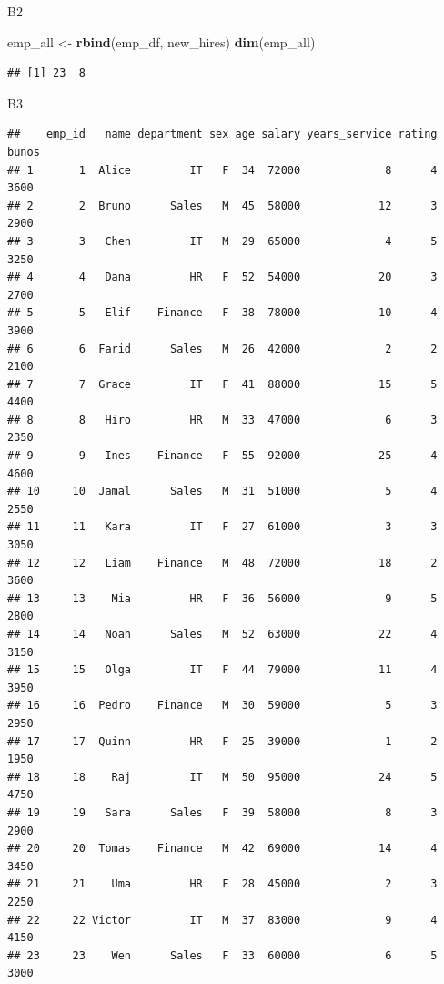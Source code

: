 \documentclass[
]{article}
\newenvironment{Shaded}{\begin{snugshade}}{\end{snugshade}}
\newcommand{\FloatTok}[1]{\textcolor[rgb]{0.00,0.00,0.81}{#1}}
\newcommand{\FunctionTok}[1]{\textcolor[rgb]{0.13,0.29,0.53}{\textbf{#1}}}
\newcommand{\NormalTok}[1]{#1}
\newcommand{\OtherTok}[1]{\textcolor[rgb]{0.56,0.35,0.01}{#1}}
\newcommand{\SpecialCharTok}[1]{\textcolor[rgb]{0.81,0.36,0.00}{\textbf{#1}}}
\begin{document}
B2

\begin{Shaded}
\begin{Highlighting}[]
\NormalTok{emp\_all }\OtherTok{\textless{}{-}} \FunctionTok{rbind}\NormalTok{(emp\_df, new\_hires)}
\FunctionTok{dim}\NormalTok{(emp\_all)}
\end{Highlighting}
\end{Shaded}

\begin{verbatim}
## [1] 23  8
\end{verbatim}

B3

\begin{Shaded}
\end{Shaded}

\begin{verbatim}
##    emp_id   name department sex age salary years_service rating bunos
## 1       1  Alice         IT   F  34  72000             8      4  3600
## 2       2  Bruno      Sales   M  45  58000            12      3  2900
## 3       3   Chen         IT   M  29  65000             4      5  3250
## 4       4   Dana         HR   F  52  54000            20      3  2700
## 5       5   Elif    Finance   F  38  78000            10      4  3900
## 6       6  Farid      Sales   M  26  42000             2      2  2100
## 7       7  Grace         IT   F  41  88000            15      5  4400
## 8       8   Hiro         HR   M  33  47000             6      3  2350
## 9       9   Ines    Finance   F  55  92000            25      4  4600
## 10     10  Jamal      Sales   M  31  51000             5      4  2550
## 11     11   Kara         IT   F  27  61000             3      3  3050
## 12     12   Liam    Finance   M  48  72000            18      2  3600
## 13     13    Mia         HR   F  36  56000             9      5  2800
## 14     14   Noah      Sales   M  52  63000            22      4  3150
## 15     15   Olga         IT   F  44  79000            11      4  3950
## 16     16  Pedro    Finance   M  30  59000             5      3  2950
## 17     17  Quinn         HR   F  25  39000             1      2  1950
## 18     18    Raj         IT   M  50  95000            24      5  4750
## 19     19   Sara      Sales   F  39  58000             8      3  2900
## 20     20  Tomas    Finance   M  42  69000            14      4  3450
## 21     21    Uma         HR   F  28  45000             2      3  2250
## 22     22 Victor         IT   M  37  83000             9      4  4150
## 23     23    Wen      Sales   F  33  60000             6      5  3000
\end{verbatim}
\end{document}
